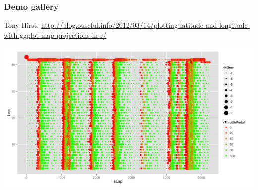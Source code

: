 \documentclass[compress]{beamer}\usepackage[]{graphicx}\usepackage[]{color}
\begin{document}
\begin{frame}[fragile]
\frametitle{Demo gallery}
Tony Hirst, \footnotesize{\url{http://blog.ouseful.info/2012/03/14/plotting-latitude-and-longitude-with-ggplot-map-projections-in-r/}}
\begin{center}
  \includegraphics[height=.6\textheight]{images/cool5.png}
\end{center}
\end{frame}
\end{document}
